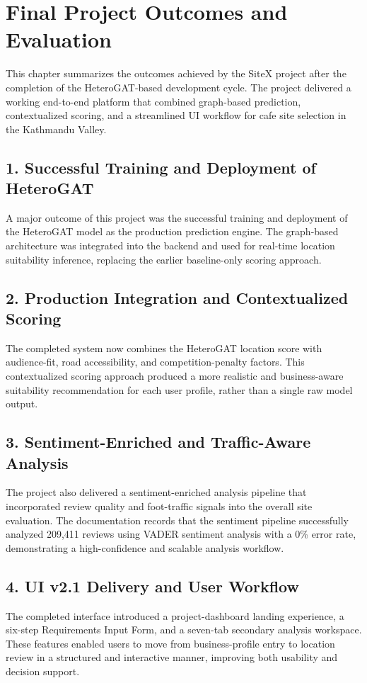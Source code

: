 \chapter{Final Project Outcomes and Evaluation}

This chapter summarizes the outcomes achieved by the SiteX project after the completion of the HeteroGAT-based development cycle. The project delivered a working end-to-end platform that combined graph-based prediction, contextualized scoring, and a streamlined UI workflow for cafe site selection in the Kathmandu Valley.

\section*{1. Successful Training and Deployment of HeteroGAT}
A major outcome of this project was the successful training and deployment of the HeteroGAT model as the production prediction engine. The graph-based architecture was integrated into the backend and used for real-time location suitability inference, replacing the earlier baseline-only scoring approach.

\section*{2. Production Integration and Contextualized Scoring}
The completed system now combines the HeteroGAT location score with audience-fit, road accessibility, and competition-penalty factors. This contextualized scoring approach produced a more realistic and business-aware suitability recommendation for each user profile, rather than a single raw model output.

\section*{3. Sentiment-Enriched and Traffic-Aware Analysis}
The project also delivered a sentiment-enriched analysis pipeline that incorporated review quality and foot-traffic signals into the overall site evaluation. The documentation records that the sentiment pipeline successfully analyzed 209,411 reviews using VADER sentiment analysis with a 0\% error rate, demonstrating a high-confidence and scalable analysis workflow.

\section*{4. UI v2.1 Delivery and User Workflow}
The completed interface introduced a project-dashboard landing experience, a six-step Requirements Input Form, and a seven-tab secondary analysis workspace. These features enabled users to move from business-profile entry to location review in a structured and interactive manner, improving both usability and decision support.

